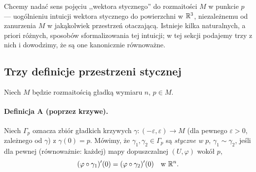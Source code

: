 Chcemy nadać sens pojęciu ,,wektora stycznego'' do rozmaitości $M$ w punkcie $p$ —
uogólnieniu intuicji wektora stycznego do powierzchni w $\mathbb{R}^3$, niezależnemu od
zanurzenia $M$ w jakąkolwiek przestrzeń otaczającą. Istnieje kilka naturalnych, a priori
różnych, sposobów sformalizowania tej intuicji; w tej sekcji podajemy trzy z nich i
dowodzimy, że są one kanonicznie równoważne.

\subsection*{Trzy definicje przestrzeni stycznej}

Niech $M$ będzie rozmaitością gładką wymiaru $n$, $p\in M$.

\paragraph*{Definicja A (poprzez krzywe).} Niech $\Gamma_p$ oznacza zbiór gładkich krzywych
$\gamma\colon(-\varepsilon,\varepsilon)\to M$ (dla pewnego $\varepsilon>0$, zależnego od
$\gamma$) z $\gamma(0)=p$. Mówimy, że $\gamma_1,\gamma_2\in\Gamma_p$ są \emph{styczne w
$p$}, $\gamma_1\sim\gamma_2$, jeśli dla pewnej (równoważnie: każdej) mapy dopuszczalnej
$(U,\varphi)$ wokół $p$,
\[
(\varphi\circ\gamma_1)'(0)=(\varphi\circ\gamma_2)'(0)\quad\text{w }\mathbb{R}^n.
\]

